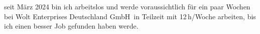 		seit März 2024 bin ich arbeitslos und werde voraussichtlich für ein paar Wochen bei \glqq Wolt Enterprises Deutschland GmbH\grqq\ in Teilzeit mit 12\,h/Woche arbeiten, bis ich einen besser Job gefunden haben werde.